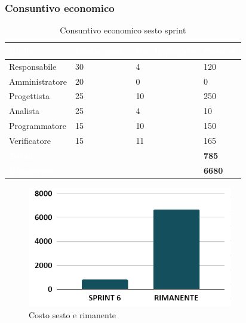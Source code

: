 \newpage
\subsubsection{Consuntivo economico}
{
\setlength{\tabcolsep}{10pt}
\renewcommand{\arraystretch}{1.5}
\begin{table}[h]
    \centering
    \begin{tabularx}{\textwidth}{| l | l | l | X |}
        \hline
        \rowcolor{headerrow} \textbf{\textcolor{white}{Ruolo}} & \textbf{\textcolor{white}{Costo orario}} & \textbf{\textcolor{white}{Ore impiegate}} & \textbf{\textcolor{white}{Costo €}} \\
        \hline
        Responsabile & 30 & 4 & 120\\
        \hline
        Amministratore & 20 & 0 & 0\\
        \hline
        Progettista & 25 & 10 & 250\\
        \hline
        Analista & 25 & 4 & 10\\
        \hline
        Programmatore & 15 & 10 & 150\\
        \hline
        Verificatore & 15 & 11 & 165\\
        \hline
        \cellcolor{headerrow} \textbf{\textcolor{white}{Totale}} &  &  & \textbf{785}\\
        \hline
        \cellcolor{headerrow} \textbf{\textcolor{white}{Rimanente}} &  &  & \textbf{6680}\\
        \hline
    \end{tabularx}
    \caption{Consuntivo economico sesto sprint}
    \label{tab:consuntivocostisestosprint}
\end{table}
}

\begin{figure}[h!]
    \centering
    \includegraphics[width=0.8\textwidth]{cons6costo.png}
    \caption{Costo sesto e rimanente}
    \label{fig:consuntivocostosestosprint}
\end{figure}

